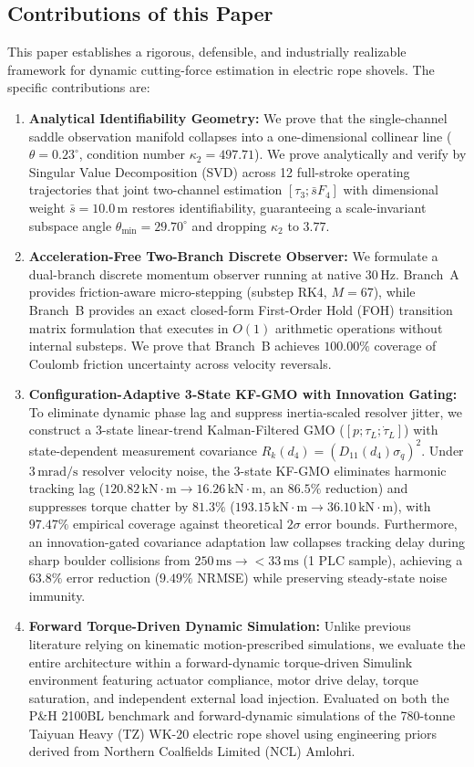 \documentclass[journal]{IEEEtran}
\begin{document}
\subsection{Contributions of this Paper}
This paper establishes a rigorous, defensible, and industrially realizable framework for dynamic cutting-force estimation in electric rope shovels. The specific contributions are:
\begin{enumerate}
    \item \textbf{Analytical Identifiability Geometry:} We prove that the single-channel saddle observation manifold collapses into a one-dimensional collinear line ($\theta = 0.23^\circ$, condition number $\kappa_2 = 497.71$). We prove analytically and verify by Singular Value Decomposition (SVD) across 12 full-stroke operating trajectories that joint two-channel estimation $[\tau_3; \bar{s} F_4]$ with dimensional weight $\bar{s} = 10.0\,\mathrm{m}$ restores identifiability, guaranteeing a scale-invariant subspace angle $\theta_{\min} = 29.70^\circ$ and dropping $\kappa_2$ to $3.77$.
    \item \textbf{Acceleration-Free Two-Branch Discrete Observer:} We formulate a dual-branch discrete momentum observer running at native $30\,\mathrm{Hz}$. Branch~A provides friction-aware micro-stepping (substep RK4, $M=67$), while Branch~B provides an exact closed-form First-Order Hold (FOH) transition matrix formulation that executes in $O(1)$ arithmetic operations without internal substeps. We prove that Branch~B achieves $100.00\%$ coverage of Coulomb friction uncertainty across velocity reversals.
    \item \textbf{Configuration-Adaptive 3-State KF-GMO with Innovation Gating:} To eliminate dynamic phase lag and suppress inertia-scaled resolver jitter, we construct a 3-state linear-trend Kalman-Filtered GMO ($[p; \tau_L; \dot{\tau}_L]$) with state-dependent measurement covariance $R_k(d_4) = (D_{11}(d_4)\sigma_{\dot{q}})^2$. Under $3\,\mathrm{mrad/s}$ resolver velocity noise, the 3-state KF-GMO eliminates harmonic tracking lag ($120.82\,\mathrm{kN\cdot m} \to 16.26\,\mathrm{kN\cdot m}$, an $86.5\%$ reduction) and suppresses torque chatter by $81.3\%$ ($193.15\,\mathrm{kN\cdot m} \to 36.10\,\mathrm{kN\cdot m}$), with $97.47\%$ empirical coverage against theoretical $2\sigma$ error bounds. Furthermore, an innovation-gated covariance adaptation law collapses tracking delay during sharp boulder collisions from $250\,\mathrm{ms} \to <33\,\mathrm{ms}$ (1 PLC sample), achieving a $63.8\%$ error reduction ($9.49\%$ NRMSE) while preserving steady-state noise immunity.
    \item \textbf{Forward Torque-Driven Dynamic Simulation:} Unlike previous literature relying on kinematic motion-prescribed simulations, we evaluate the entire architecture within a forward-dynamic torque-driven Simulink environment featuring actuator compliance, motor drive delay, torque saturation, and independent external load injection. Evaluated on both the P\&H 2100BL benchmark and forward-dynamic simulations of the 780-tonne Taiyuan Heavy (TZ) WK-20 electric rope shovel using engineering priors derived from Northern Coalfields Limited (NCL) Amlohri.
\end{enumerate}
\end{document}
